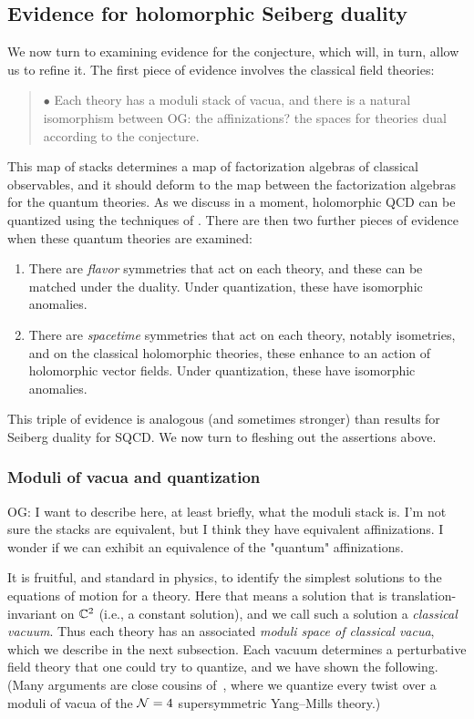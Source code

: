 \documentclass[11pt]{amsart}
\def\owen#1{{\textcolor{violet!65!black}{OG: {#1}}}}
\begin{document}
\subsection{Evidence for holomorphic Seiberg duality}

We now turn to examining evidence for the conjecture, which will, in turn, allow us to refine it.
The first piece of evidence involves the classical field theories:
\begin{quote}
$\bullet$ Each theory has a moduli stack of vacua, and there is a natural isomorphism between \owen{the affinizations?} the spaces for theories dual according to the conjecture.
\end{quote}
This map of stacks determines a map of factorization algebras of classical observables,
and it should deform to the map between the factorization algebras for the quantum theories.
As we discuss in a moment, holomorphic QCD can be quantized using the techniques of \cite{BW work}.
There are then two further pieces of evidence when these quantum theories are examined:
\begin{enumerate}
\item There are {\em flavor} symmetries that act on each theory, and these can be matched under the duality. Under quantization, these have isomorphic anomalies.
\item There are {\em spacetime} symmetries that act on each theory, notably isometries, and on the classical holomorphic theories, these enhance to an action of holomorphic vector fields. Under quantization, these have isomorphic anomalies.
\end{enumerate}
This triple of evidence is analogous (and sometimes stronger) than results for Seiberg duality for SQCD. 
We now turn to fleshing out the assertions above.

\subsubsection{Moduli of vacua and quantization}

\owen{I want to describe here, at least briefly, what the moduli stack is. I'm not sure the stacks are equivalent, but I think they have equivalent affinizations. I wonder if we can exhibit an equivalence of the "quantum" affinizations.}

It is fruitful, and standard in physics, to identify the simplest solutions to the equations of motion for a theory.
Here that means a solution that is translation-invariant on $\mathbb C^2$ (i.e., a constant solution),
and we call such a solution a {\em classical vacuum}.
Thus each theory has an associated {\em moduli space of classical vacua},
which we describe in the next subsection.
Each vacuum determines a perturbative field theory that one could try to quantize,
and we have shown the following.
(Many arguments are close cousins of~\cite{EGW}, where we quantize every twist over a moduli of vacua of the $\mathcal N=4$ supersymmetric Yang--Mills theory.)
\end{document}
